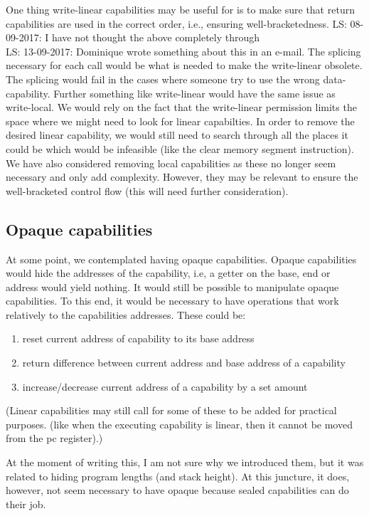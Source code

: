 \documentclass[a4paper]{article}
\newcommand\lau[1]{{\color{purple} \sf \footnotesize {LS: #1}}\\}
\begin{document}
One thing write-linear capabilities may be useful for is to make sure that return capabilities are used in the correct order, i.e., ensuring well-bracketedness. 
\lau{08-09-2017: I have not thought the above completely through} 
\lau{13-09-2017: Dominique wrote something about this in an e-mail. The splicing necessary for each call would be what is needed to make the write-linear obsolete. The splicing would fail in the cases where someone try to use the wrong data-capability. Further something like write-linear would have the same issue as write-local. We would rely on the fact that the write-linear permission limits the space where we might need to look for linear capabilties. In order to remove the desired linear capability, we would still need to search through all the places it could be which would be infeasible (like the clear memory segment instruction).}

We have also considered removing local capabilities as these no longer seem necessary and only add complexity. However, they may be relevant to ensure the well-bracketed control flow (this will need further consideration).

\subsection{Opaque capabilities}
At some point, we contemplated having opaque capabilities. Opaque capabilities would hide the addresses of the capability, i.e, a getter on the base, end or address would yield nothing. It would still be possible to manipulate opaque capabilities. To this end, it would be necessary to have operations that work relatively to the capabilities addresses. These could be: 
\begin{enumerate}
\item reset current address of capability to its base address
\item return difference between current address and base address of a capability
\item increase/decrease current address of a capability by a set amount
\end{enumerate}
(Linear capabilities may still call for some of these to be added for practical purposes. (like when the executing capability is linear, then it cannot be moved from the pc register).)

At the moment of writing this, I am not sure why we introduced them, but it was related to hiding program lengths (and stack height).
At this juncture, it does, however, not seem necessary to have opaque because sealed capabilities can do their job.
\end{document}
